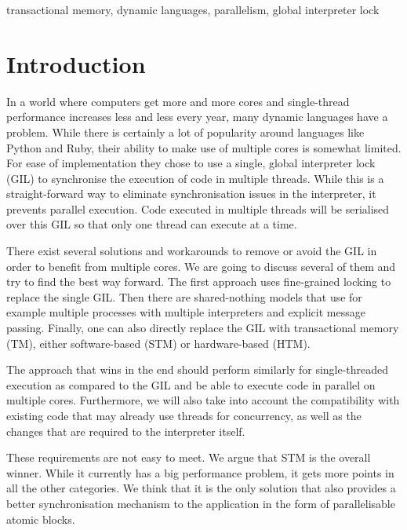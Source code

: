 \documentclass{sigplanconf}
\begin{document}


\keywords
transactional memory, dynamic languages, parallelism, global interpreter lock

\section{Introduction}
In a world where computers get more and more cores and single-thread
performance increases less and less every year, many dynamic languages
have a problem. While there is certainly a lot of popularity around
languages like Python and Ruby, their ability to make use of multiple
cores is somewhat limited. For ease of implementation they chose to
use a single, global interpreter lock (GIL) to synchronise the
execution of code in multiple threads. While this is a
straight-forward way to eliminate synchronisation issues in the
interpreter, it prevents parallel execution. Code executed in multiple
threads will be serialised over this GIL so that only one thread can
execute at a time.

There exist several solutions and workarounds to remove or avoid the
GIL in order to benefit from multiple cores. We are going to discuss
several of them and try to find the best way forward. The first
approach uses fine-grained locking to replace the single GIL. Then
there are shared-nothing models that use for example multiple
processes with multiple interpreters and explicit message
passing. Finally, one can also directly replace the GIL with
transactional memory (TM), either software-based (STM) or
hardware-based (HTM).

The approach that wins in the end should perform similarly for
single-threaded execution as compared to the GIL and be able to
execute code in parallel on multiple cores. Furthermore, we will also
take into account the compatibility with existing code that may already use
threads for concurrency, as well as the changes that are required to
the interpreter itself.

These requirements are not easy to meet. We argue that STM is the
overall winner. While it currently has a big performance problem, it
gets more points in all the other categories. We think that it is the
only solution that also provides a better synchronisation mechanism to
the application in the form of parallelisable atomic blocks.
\end{document}

